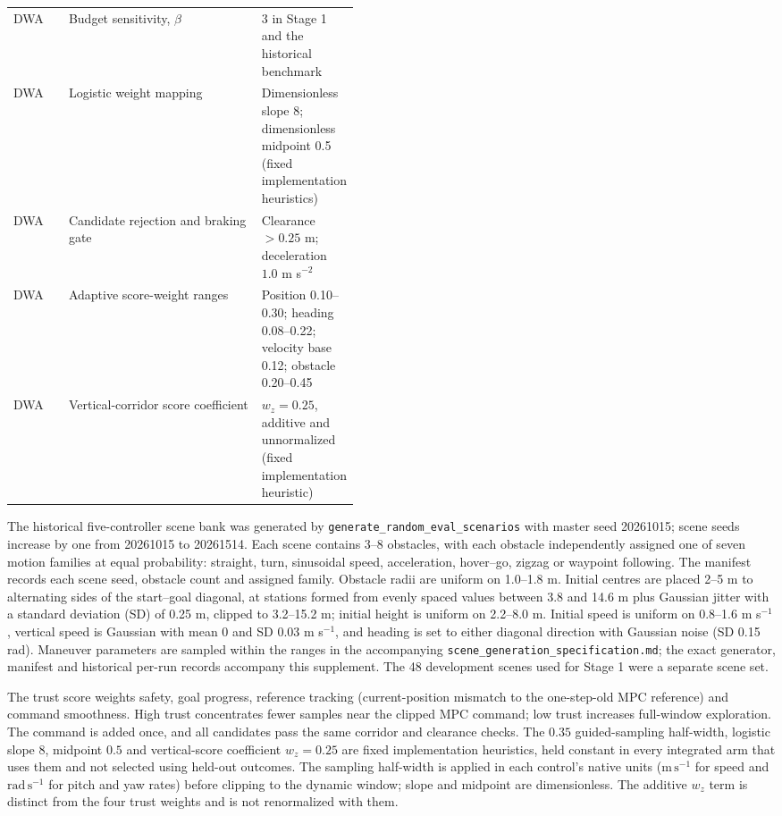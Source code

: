 \documentclass[10pt]{article}
\begin{document}
\begin{table}[!htbp]
\begin{tabularx}{\linewidth}{@{}>{\raggedright\arraybackslash}p{0.16\linewidth}X>{\raggedright\arraybackslash}p{0.29\linewidth}@{}}
DWA & Budget sensitivity, $\beta$ & $3$ in Stage 1 and the historical benchmark \\
DWA & Logistic weight mapping & Dimensionless slope 8; dimensionless midpoint 0.5 (fixed implementation heuristics) \\
DWA & Candidate rejection and braking gate & Clearance $>0.25$ m; deceleration $1.0$ m s$^{-2}$ \\
DWA & Adaptive score-weight ranges & Position 0.10--0.30; heading 0.08--0.22; velocity base 0.12; obstacle 0.20--0.45 \\
DWA & Vertical-corridor score coefficient & $w_z=0.25$, additive and unnormalized (fixed implementation heuristic) \\
\bottomrule
\end{tabularx}
\end{table}

The historical five-controller scene bank was generated by \texttt{generate\_random\_eval\_scenarios} with master seed 20261015; scene seeds increase by one from 20261015 to 20261514. Each scene contains 3--8 obstacles, with each obstacle independently assigned one of seven motion families at equal probability: straight, turn, sinusoidal speed, acceleration, hover--go, zigzag or waypoint following. The manifest records each scene seed, obstacle count and assigned family. Obstacle radii are uniform on 1.0--1.8 m. Initial centres are placed 2--5 m to alternating sides of the start--goal diagonal, at stations formed from evenly spaced values between 3.8 and 14.6 m plus Gaussian jitter with a standard deviation (SD) of 0.25 m, clipped to 3.2--15.2 m; initial height is uniform on 2.2--8.0 m. Initial speed is uniform on 0.8--1.6 m s$^{-1}$, vertical speed is Gaussian with mean 0 and SD 0.03 m s$^{-1}$, and heading is set to either diagonal direction with Gaussian noise (SD 0.15 rad). Maneuver parameters are sampled within the ranges in the accompanying \texttt{scene\_generation\_specification.md}; the exact generator, manifest and historical per-run records accompany this supplement. The 48 development scenes used for Stage 1 were a separate scene set.

The trust score weights safety, goal progress, reference tracking (current-position mismatch to the one-step-old MPC reference) and command smoothness. High trust concentrates fewer samples near the clipped MPC command; low trust increases full-window exploration. The command is added once, and all candidates pass the same corridor and clearance checks. The $0.35$ guided-sampling half-width, logistic slope $8$, midpoint $0.5$ and vertical-score coefficient $w_z=0.25$ are fixed implementation heuristics, held constant in every integrated arm that uses them and not selected using held-out outcomes. The sampling half-width is applied in each control's native units ($\mathrm{m\,s^{-1}}$ for speed and $\mathrm{rad\,s^{-1}}$ for pitch and yaw rates) before clipping to the dynamic window; slope and midpoint are dimensionless. The additive $w_z$ term is distinct from the four trust weights and is not renormalized with them.
\end{document}
